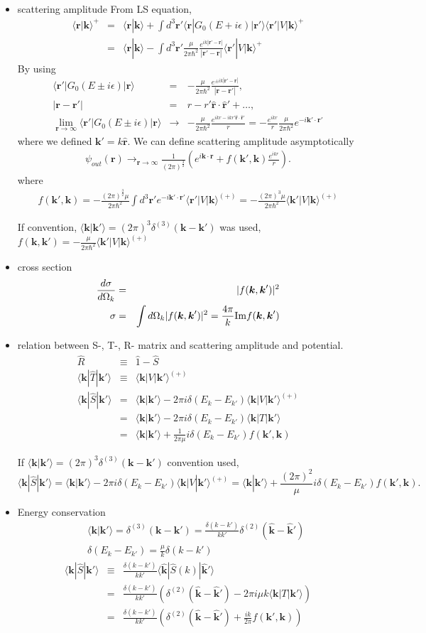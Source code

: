 \documentclass[10pt]{article}
\def\bm{\boldsymbol}
\newcommand{\bea}{\begin{eqnarray}}
\newcommand{\eea}{\end{eqnarray}}
\newcommand{\no}{\nonumber \\}
\def\vk{{\bm k}}
\def\vr{{\bm r}}
\def\la{\langle}
\def\ra{\rangle}
\begin{document}
\begin{itemize}
\item scattering amplitude
From LS equation,
\bea
\la\vr|\vk\ra^{+}
&=&\la \vr|\vk\ra+\int d^3\vr' \la \vr|G_0(E+i\epsilon)|\vr' \ra
 \la\vr'|V|\vk\ra^{+} \no 
&=&\la \vr|\vk\ra- \int d^3\vr'\frac{\mu}{2\pi\hbar^2}
   \frac{e^{ik|\vr'-\vr|}}{|\vr'-\vr|}\la \vr'|V|\vk\ra^+
\eea
By using
\bea
\la \vr'|G_0(E\pm i\epsilon)|\vr \ra&=&-\frac{\mu}{2\pi\hbar^2}
              \frac{e^{\pm i k|\vr'-\vr|}}{|\vr-\vr'|},\no 
|\vr-\vr'|&=& r-r' {\hat \vr}\cdot{\hat \vr'}+\dots,\no 
\lim_{\vr\to \infty}\la \vr'|G_0(E\pm i\epsilon)|\vr \ra
   &\to& -\frac{\mu}{2\pi\hbar^2}
   \frac{e^{ikr-ikr'\hat{\vr}\cdot{\hat\vr}'}}{r}
   = -\frac{e^{ikr}}{r}\frac{\mu}{2\pi\hbar^2}e^{-i\vk' \cdot{\vr}'}
\eea
where we defined $\vk'=k\hat{\vr}$.
We can define scattering amplitude asymptotically
\bea
\psi_{out}(\vr)\to_{\vr\to \infty} \frac{1}{(2\pi)^{\frac{3}{2}}}
     \left(e^{i\vk\cdot\vr}+f(\vk',\vk)\frac{e^{ikr}}{r}\right).
\eea
where
\bea
\boxed{
f(\vk',\vk)=-\frac{(2\pi)^{\frac{3}{2}}\mu}{2\pi\hbar^2} 
                    \int d^3\vr' e^{-i\vk'\cdot\vr'}
                    \la \vr'|V|\vk\ra^{(+)}
            =-\frac{(2\pi)^3\mu}{2\pi\hbar^2}\la \vk'|V|\vk\ra^{(+)}
            }
\eea

If convention, $\la \vk|\vk'\ra=(2\pi)^3\delta^{(3)}(\vk-\vk')$
was used, $f(\vk,\vk')=-\frac{\mu}{2\pi\hbar^2}\la \vk'|V|\vk\ra^{(+)}$
 
\item cross section
\bea
\frac{d\sigma}{d\Omega_k}&=&|f(\vk,\vk')|^2 \no
\sigma&=&\int d\Omega_k |f(\vk,\vk')|^2 
       =\frac{4\pi}{k}{\rm Im}f(\vk,\vk')
\eea

\item relation between S-, T-, R- matrix and scattering amplitude
and potential.
\bea
\hat{R}& \equiv& \hat{1}-\hat{S} \no
\la \vk|\hat{T}|\vk'\ra &\equiv& \la \vk|V|\vk'\ra^{(+)} \no
\la \vk|\hat{S}|\vk'\ra
&=&\la \vk|\vk'\ra-2\pi i\delta(E_k-E_{k'})\la \vk|V|\vk'\ra^{(+)}
\no
&=&\la \vk|\vk'\ra-2\pi i\delta(E_k-E_{k'})\la \vk|T|\vk'\ra \no
&=&\la \vk|\vk'\ra
   +\frac{1}{2\pi\mu} i\delta(E_k-E_{k'}) f(\vk',\vk)
\eea

If $\la \vk|\vk'\ra=(2\pi)^3\delta^{(3)}(\vk-\vk')$
convention used,
$$\la \vk|\hat{S}|\vk'\ra
=\la \vk|\vk'\ra-2\pi i\delta(E_k-E_{k'})\la \vk|V|\vk'\ra^{(+)}
=\la \vk|\vk'\ra+\frac{(2\pi)^2}{\mu} i\delta(E_k-E_{k'})
  f(\vk',\vk).$$

\item Energy conservation
\bea
& &\la \vk|\vk'\ra=\delta^{(3)}(\vk-\vk')
  =\frac{\delta(k-k')}{k k'}\delta^{(2)}(\hat{\vk}-\hat{\vk}')\no
& &\delta(E_k-E_{k'})=\frac{\mu}{k}\delta(k-k') 
\eea
\bea
\la \vk|\hat{S}|\vk'\ra
&\equiv&  \frac{\delta(k-k')}{k k'}\la\hat{\vk}|\hat{S}(k)|\hat{\vk}'\ra \no
&=&\frac{\delta(k-k')}{k k'}\left(\delta^{(2)}(\hat{\vk}-\hat{\vk}')
   -2\pi i \mu k \la \vk| T|\vk'\ra \right) \no
&=&\frac{\delta(k-k')}{k k'}\left(\delta^{(2)}(\hat{\vk}-\hat{\vk}')
   +\frac{i k}{2\pi}  f(\vk',\vk)\right) 
\eea


\end{itemize}
\end{document}
